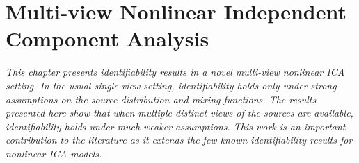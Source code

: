 
\newcommand\independent{\protect\mathpalette{\protect\independenT}{\perp}}
\def\independenT#1#2{\mathrel{\rlap{$#1#2$}\mkern2mu{#1#2}}}


\chapter{Multi-view Nonlinear Independent Component Analysis}\label{chapter:ica}

\ifpdf
    \graphicspath{{Chapter4/Figs/Raster/}{Chapter4/Figs/PDF/}{Chapter4/Figs/}}
\else
    \graphicspath{{Chapter4/Figs/Vector/}{Chapter4/Figs/}}
\fi

\emph{%
This chapter presents identifiability results in a novel multi-view nonlinear ICA setting.
In the usual single-view setting, identifiability holds only under strong assumptions on the source distribution and mixing functions.
The results presented here show that when multiple distinct views of the sources are available, identifiability holds under much weaker assumptions.
This work is an important contribution to the literature as it extends the few known identifiability results for nonlinear ICA models.}

%
%




